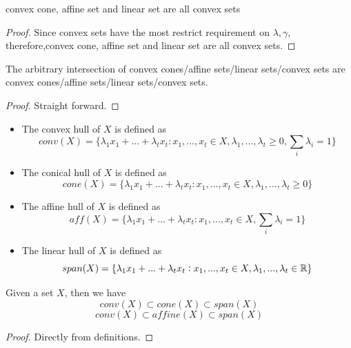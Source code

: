 \begin{refsection}
\begin{lemma}
convex cone, affine set and linear set are all convex sets
\end{lemma}
\begin{proof}
	Since convex 
	sets have the most restrict requirement on $\lambda,\gamma$, therefore,convex cone, affine set and linear set are all convex sets. 
\end{proof}

\begin{lemma}
The arbitrary intersection of convex cones/affine sets/linear sets/convex sets are convex cones/affine sets/linear sets/convex sets.
\end{lemma}
\begin{proof}
	Straight forward.
\end{proof}




\begin{definition}\cite[lec 1]{Basu2016introduction}\hfill
	\begin{itemize}
		\item The convex hull of $X$ is defined as 
		$$conv(X) = \{\lambda_1 x_1 + ... + \lambda_t x_t: x_1,...,x_t\in X,\lambda_1,...,\lambda_t \geq 0, \sum_i \lambda_i = 1\} $$
		\item The conical hull of $X$ is defined as 
		$$cone(X) = \{\lambda_1 x_1 + ... + \lambda_t x_t: x_1,...,x_t\in X,\lambda_1,...,\lambda_t \geq 0\} $$
		\item The affine hull of $X$ is defined as 
		$$aff(X) = \{\lambda_1 x_1 + ... + \lambda_t x_t: x_1,...,x_t\in X, \sum_i \lambda_i = 1\} $$
		\item The linear hull of $X$ is defined as 
		$$span(X) = \{\lambda_1 x_1 + ... + \lambda_t x_t: x_1,...,x_t\in X,\lambda_1,...,\lambda_t \in \mathbb{R}\} $$
	\end{itemize}
\end{definition}

\begin{lemma}
	Given a set $X$, then we have
	$$conv(X)\subset cone(X) \subset span(X)$$
	$$conv(X)\subset affine(X) \subset span(X)$$
\end{lemma}
\begin{proof}
	Directly from definitions.
\end{proof}


\end{refsection}
